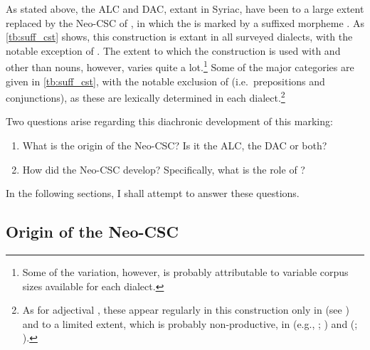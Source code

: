 As stated above, the ALC and DAC, extant in Syriac, have been to a large extent replaced by  the Neo-CSC of , in which the \prim is marked by a suffixed morpheme \ed. As \vref{tb:suff_cst} shows, this construction is extant in all surveyed  dialects, with the notable exception of \JSan. The extent to which the construction is used with \prims and \secns other than nouns, however, varies quite a lot.\footnote{Some of the variation, however, is probably attributable to variable corpus sizes available for each dialect.} Some of the major categories are given in \ref{tb:suff_cst}, with the notable exclusion of  \prims (i.e.\ prepositions and conjunctions), as these are lexically determined in each dialect.\footnote{As for adjectival \secns, these appear regularly in this construction only in \Arb (see ) and to a limited extent, which is probably non-productive, in \Barw (e.g., ; \cite[523]{KhanBarwar}) and \Barz (; \cite[4, fn.\ 33]{MutzafiBarzani}).}

  
Two questions arise regarding this diachronic development of this marking:

\begin{enumerate}

\item What is the origin of the Neo-CSC? Is it the ALC, the DAC or both? 
\item How did the Neo-CSC develop? Specifically, what is the role of ? 
\end{enumerate}  

In the following sections, I shall attempt to answer these questions.

\subsection{Origin of the Neo-CSC} \label{ss:NeoCSC_Origin}



